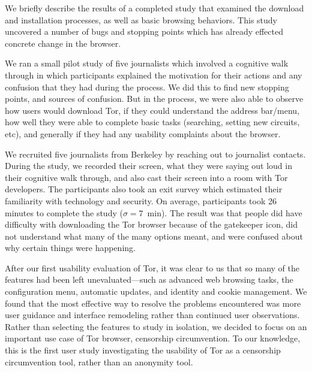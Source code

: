 \documentclass{sig-alternate-hotpets15}
\begin{document}
We briefly describe the results of a completed study
that examined the download and installation processes, 
as well as basic browsing behaviors.
This study uncovered a number of bugs and stopping points
which has already effected concrete change in the browser.

We ran a small pilot study of five journalists which involved a cognitive walk through in which 
participants explained the motivation for their actions and any confusion that they had during the process. 
We did this to find new stopping points, and sources of confusion. 
But in the process, we were also able to observe how users would download Tor, 
if they could understand the address bar/menu, how well they were able to complete basic tasks
(searching, setting new circuits, etc), and generally if they had any usability complaints about the browser. 

We recruited five journalists from Berkeley by reaching out to journalist contacts. 
During the study, we recorded their screen, what they were saying out loud in their cognitive walk through, and also cast their screen into a room with Tor developers. The participants also took an exit survey which estimated their familiarity with technology and security. On average, participants took 26 minutes to complete the study ($\sigma = 7$~min).  The result was that people did have difficulty with downloading the Tor browser because of the gatekeeper icon, did not understand what many of the many options meant, and were confused about why certain things were happening. 

After our first  usability evaluation of Tor, it was clear to us that so many of the features had been left unevaluated---such as advanced web browsing tasks, the configuration menu, automatic updates, and identity and cookie management. 
We found that the most effective way to resolve the problems encountered was more user guidance and interface remodeling rather than continued user observations.
Rather than selecting the features to study in isolation, 
we decided to focus on an important use case of Tor browser, censorship circumvention. 
To our knowledge, this is the first user study investigating the usability of Tor as a 
censorship circumvention tool, rather than an anonymity tool. 
\end{document}
